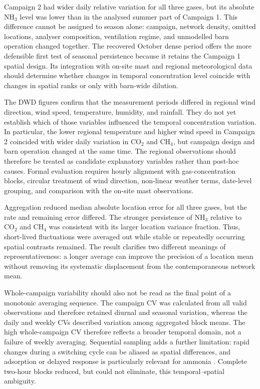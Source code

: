 \documentclass[12pt,a4paper]{article}
\begin{document}
Campaign 2 had wider daily relative variation for all three gases, but its
absolute \(\mathrm{NH_3}\) level was lower than in the analysed summer part
of Campaign 1. This difference cannot be assigned to season alone: campaign,
network density, omitted locations, analyser composition, ventilation regime,
and unmodelled barn operation changed together. The recovered October dense
period offers the more defensible first test of seasonal persistence because
it retains the Campaign 1 spatial design. Its integration with on-site mast
and regional meteorological data should determine whether changes in temporal
concentration level coincide with changes in spatial ranks or only with
barn-wide dilution.

The DWD figures confirm that the measurement periods differed in regional wind
direction, wind speed, temperature, humidity, and rainfall. They do not yet
establish which of those variables influenced the temporal concentration
variation. In particular, the lower regional temperature and higher wind speed
in Campaign 2 coincided with wider daily variation in \(\mathrm{CO_2}\) and
\(\mathrm{CH_4}\), but campaign design and barn operation changed at the same
time. The regional observations should therefore be treated as candidate
explanatory variables rather than post-hoc causes. Formal evaluation requires
hourly alignment with gas-concentration blocks, circular treatment of wind
direction, non-linear weather terms, date-level grouping, and comparison with
the on-site mast observations.

Aggregation reduced median absolute location error for all three gases, but
the rate and remaining error differed. The stronger persistence of
\(\mathrm{NH_3}\) relative to \(\mathrm{CO_2}\) and
\(\mathrm{CH_4}\) was consistent with its larger location variance fraction.
Thus, short-lived fluctuations were averaged out while stable or repeatedly
occurring spatial contrasts remained. The result clarifies two different
meanings of representativeness: a longer average can improve the precision of
a location mean without removing its systematic displacement from the
contemporaneous network mean.

Whole-campaign variability should also not be read as the final point of a
monotonic averaging sequence. The campaign CV was calculated from all valid
observations and therefore retained diurnal and seasonal variation, whereas
the daily and weekly CVs described variation among aggregated block means.
The high whole-campaign CV therefore reflects a broader temporal domain, not a
failure of weekly averaging. Sequential sampling adds a further limitation:
rapid changes during a switching cycle can be aliased as spatial differences,
and adsorption or delayed response is particularly relevant for ammonia
\citep{Rom2010}. Complete two-hour blocks reduced, but could not eliminate,
this temporal--spatial ambiguity.
\end{document}
